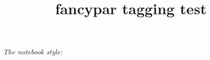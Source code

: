 \documentclass{article}
\title{fancypar tagging test}
\begin{document}
\textit{The notebook style:}
\NotebookPar{\kant[2]}
\end{document}
